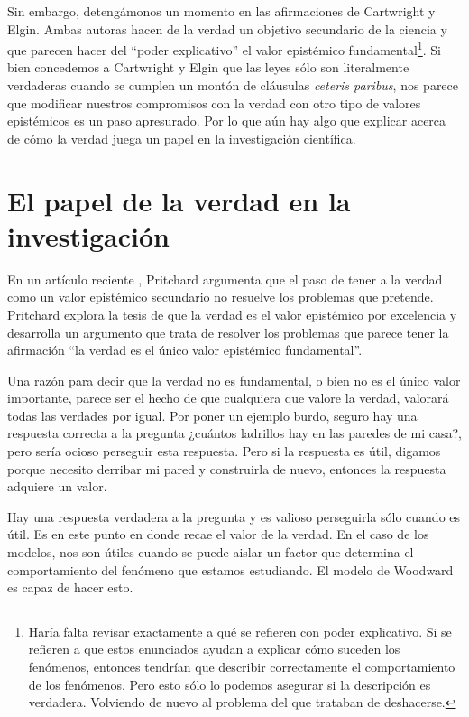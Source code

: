 Sin embargo, detengámonos un momento en las afirmaciones de Cartwright y Elgin. Ambas autoras hacen de la verdad un objetivo secundario de la ciencia y que parecen hacer del ``poder explicativo'' el valor epistémico fundamental\footnote{Haría falta revisar exactamente a qué se refieren con poder explicativo. Si se refieren a que estos enunciados ayudan a explicar cómo suceden los fenómenos, entonces tendrían que describir correctamente el comportamiento de los fenómenos. Pero esto sólo lo podemos asegurar si la descripción es verdadera. Volviendo de nuevo al problema del que trataban de deshacerse.}. Si bien concedemos a Cartwright y Elgin que las leyes sólo son literalmente verdaderas cuando se cumplen un montón de cláusulas \emph{ceteris paribus}, nos parece que modificar nuestros compromisos con la verdad con otro tipo de valores epistémicos es un paso apresurado. Por lo que aún hay algo que explicar acerca de cómo la verdad juega un papel en la investigación científica.

\section{El papel de la verdad en la investigación}

\noindent En un artículo reciente \cite{Pritchard2019}, Pritchard argumenta que el paso de tener a la verdad como un valor epistémico secundario no resuelve los problemas que pretende. Pritchard explora la tesis de que la verdad es el valor epistémico por excelencia y desarrolla un argumento que trata de resolver los problemas que parece tener la afirmación ``la verdad es el único valor epistémico fundamental''.

Una razón para decir que la verdad no es fundamental, o bien no es el único valor importante, parece ser el hecho de que cualquiera que valore la verdad, valorará todas las verdades por igual. Por poner un ejemplo burdo, seguro hay una respuesta correcta a la pregunta ¿cuántos ladrillos hay en las paredes de mi casa?, pero sería ocioso perseguir esta respuesta. Pero si la respuesta es útil, digamos porque necesito derribar mi pared y construirla de nuevo, entonces la respuesta adquiere un valor.

Hay una respuesta verdadera a la pregunta y es valioso perseguirla sólo cuando es útil. Es en este punto en donde recae el valor de la verdad. En el caso de los modelos, nos son útiles cuando se puede aislar un factor que determina el comportamiento del fenómeno que estamos estudiando. El modelo de Woodward es capaz de hacer esto.

